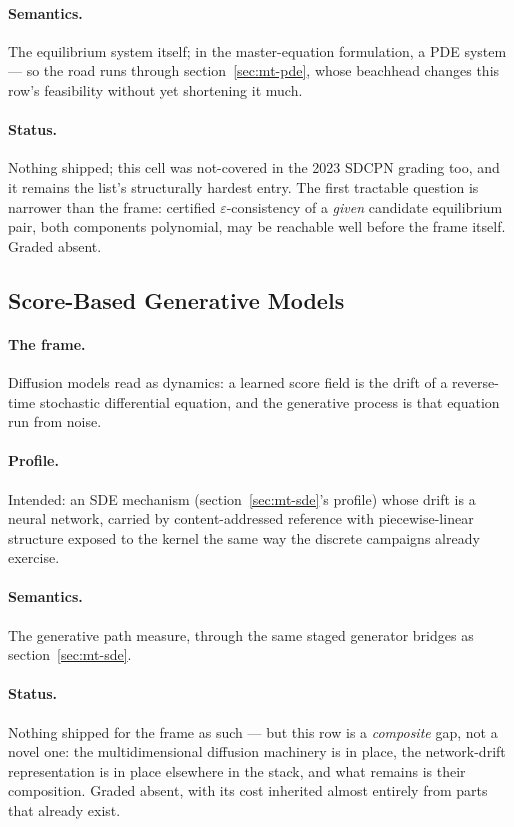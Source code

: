 \paragraph{Semantics.} The equilibrium system itself; in the
master-equation formulation, a PDE system --- so the road runs
through section~\ref{sec:mt-pde}, whose beachhead changes this row's
feasibility without yet shortening it much.

\paragraph{Status.} Nothing shipped; this cell was not-covered in the
2023 SDCPN grading too, and it remains the list's structurally
hardest entry. The first tractable question is narrower than the
frame:
certified $\varepsilon$-consistency of a \emph{given} candidate
equilibrium pair, both components polynomial, may be reachable well
before the frame itself. Graded absent.

\subsection{Score-Based Generative Models}
\label{sec:mt-sbgm}

\paragraph{The frame.} Diffusion models read as dynamics: a learned
score field is the drift of a reverse-time stochastic differential
equation, and the generative process is that equation run from
noise.

\paragraph{Profile.} Intended: an SDE mechanism
(section~\ref{sec:mt-sde}'s profile) whose drift is a neural
network, carried by content-addressed reference with piecewise-linear
structure exposed to the kernel the same way the discrete campaigns
already exercise.

\paragraph{Semantics.} The generative path measure, through the
same staged generator bridges as section~\ref{sec:mt-sde}.

\paragraph{Status.} Nothing shipped for the frame as such --- but
this row is a \emph{composite} gap, not a novel one: the
multidimensional diffusion machinery is in place, the network-drift
representation is in place elsewhere in the stack, and what remains is
their composition. Graded absent, with its cost inherited almost
entirely from parts that already exist.

